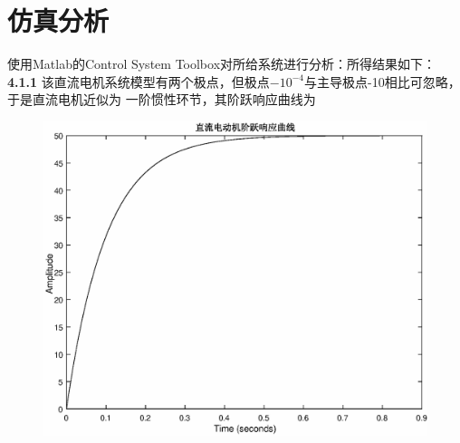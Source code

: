 \documentclass[10.5pt]{ctexart}
\begin{document}
\title{\textbf{}} %
\author{}
\maketitle
\section{仿真分析}
使用Matlab的Control System Toolbox对所给系统进行分析：所得结果如下：
\textbf{4.1.1} 该直流电机系统模型有两个极点，但极点$-10^{-4}$与主导极点-10相比可忽略，于是直流电机近似为
一阶惯性环节，其阶跃响应曲线为
\begin{figure}[!ht]
\centering
\includegraphics[width=400pt]{step_response_411.eps}
\end{figure}
\end{document}
